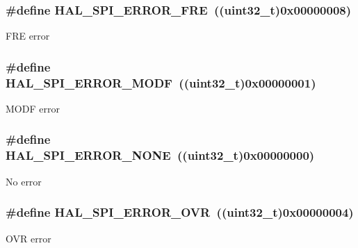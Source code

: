 \subsubsection[{\texorpdfstring{H\+A\+L\+\_\+\+S\+P\+I\+\_\+\+E\+R\+R\+O\+R\+\_\+\+F\+RE}{HAL_SPI_ERROR_FRE}}]{\setlength{\rightskip}{0pt plus 5cm}\#define H\+A\+L\+\_\+\+S\+P\+I\+\_\+\+E\+R\+R\+O\+R\+\_\+\+F\+RE~((uint32\+\_\+t)0x00000008)}\hypertarget{group___s_p_i___error___code_gaf03238e57dd0c4d277fef2aa7a083133}{}\label{group___s_p_i___error___code_gaf03238e57dd0c4d277fef2aa7a083133}
F\+RE error 
\subsubsection[{\texorpdfstring{H\+A\+L\+\_\+\+S\+P\+I\+\_\+\+E\+R\+R\+O\+R\+\_\+\+M\+O\+DF}{HAL_SPI_ERROR_MODF}}]{\setlength{\rightskip}{0pt plus 5cm}\#define H\+A\+L\+\_\+\+S\+P\+I\+\_\+\+E\+R\+R\+O\+R\+\_\+\+M\+O\+DF~((uint32\+\_\+t)0x00000001)}\hypertarget{group___s_p_i___error___code_ga75f5edd4e2a7a95bc9a994244df52460}{}\label{group___s_p_i___error___code_ga75f5edd4e2a7a95bc9a994244df52460}
M\+O\+DF error 
\subsubsection[{\texorpdfstring{H\+A\+L\+\_\+\+S\+P\+I\+\_\+\+E\+R\+R\+O\+R\+\_\+\+N\+O\+NE}{HAL_SPI_ERROR_NONE}}]{\setlength{\rightskip}{0pt plus 5cm}\#define H\+A\+L\+\_\+\+S\+P\+I\+\_\+\+E\+R\+R\+O\+R\+\_\+\+N\+O\+NE~((uint32\+\_\+t)0x00000000)}\hypertarget{group___s_p_i___error___code_gaac0006cdf5670741f8702e55d4bf4601}{}\label{group___s_p_i___error___code_gaac0006cdf5670741f8702e55d4bf4601}
No error 
\subsubsection[{\texorpdfstring{H\+A\+L\+\_\+\+S\+P\+I\+\_\+\+E\+R\+R\+O\+R\+\_\+\+O\+VR}{HAL_SPI_ERROR_OVR}}]{\setlength{\rightskip}{0pt plus 5cm}\#define H\+A\+L\+\_\+\+S\+P\+I\+\_\+\+E\+R\+R\+O\+R\+\_\+\+O\+VR~((uint32\+\_\+t)0x00000004)}\hypertarget{group___s_p_i___error___code_ga9587f998fed196a4f30c38f2da731c0f}{}\label{group___s_p_i___error___code_ga9587f998fed196a4f30c38f2da731c0f}
O\+VR error 